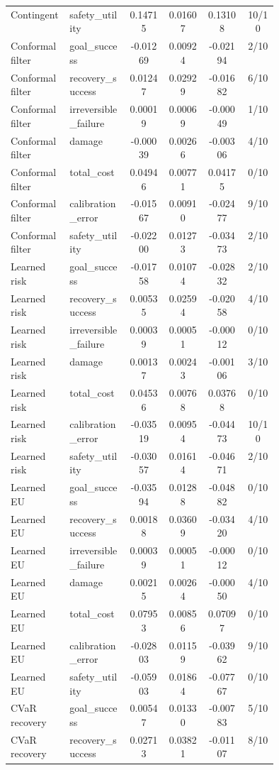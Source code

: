 \documentclass{article}
\begin{document}
\begin{center}
\begin{longtable}{p{0.22\linewidth}p{0.22\linewidth}cccc}
Contingent & safety\_utility & 0.14715 & 0.01607 & 0.13108 & 10/10\\
Conformal filter & goal\_success & -0.01269 & 0.00924 & -0.02194 & 2/10\\
Conformal filter & recovery\_success & 0.01247 & 0.02929 & -0.01682 & 6/10\\
Conformal filter & irreversible\_failure & 0.00019 & 0.00069 & -0.00049 & 1/10\\
Conformal filter & damage & -0.00039 & 0.00266 & -0.00306 & 4/10\\
Conformal filter & total\_cost & 0.04946 & 0.00771 & 0.04175 & 0/10\\
Conformal filter & calibration\_error & -0.01567 & 0.00910 & -0.02477 & 9/10\\
Conformal filter & safety\_utility & -0.02200 & 0.01273 & -0.03473 & 2/10\\
Learned risk & goal\_success & -0.01758 & 0.01074 & -0.02832 & 2/10\\
Learned risk & recovery\_success & 0.00535 & 0.02594 & -0.02058 & 4/10\\
Learned risk & irreversible\_failure & 0.00039 & 0.00051 & -0.00012 & 0/10\\
Learned risk & damage & 0.00137 & 0.00243 & -0.00106 & 3/10\\
Learned risk & total\_cost & 0.04536 & 0.00768 & 0.03768 & 0/10\\
Learned risk & calibration\_error & -0.03519 & 0.00954 & -0.04473 & 10/10\\
Learned risk & safety\_utility & -0.03057 & 0.01614 & -0.04671 & 2/10\\
Learned EU & goal\_success & -0.03594 & 0.01288 & -0.04882 & 0/10\\
Learned EU & recovery\_success & 0.00188 & 0.03609 & -0.03420 & 4/10\\
Learned EU & irreversible\_failure & 0.00039 & 0.00051 & -0.00012 & 0/10\\
Learned EU & damage & 0.00215 & 0.00264 & -0.00050 & 4/10\\
Learned EU & total\_cost & 0.07953 & 0.00856 & 0.07097 & 0/10\\
Learned EU & calibration\_error & -0.02803 & 0.01159 & -0.03962 & 9/10\\
Learned EU & safety\_utility & -0.05903 & 0.01864 & -0.07767 & 0/10\\
CVaR recovery & goal\_success & 0.00547 & 0.01330 & -0.00783 & 5/10\\
CVaR recovery & recovery\_success & 0.02713 & 0.03821 & -0.01107 & 8/10\\

\end{longtable}
\end{center}
\end{document}
